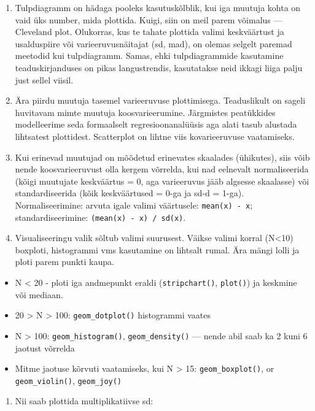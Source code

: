 \documentclass[]{book}
\providecommand{\tightlist}{%
  \setlength{\itemsep}{0pt}\setlength{\parskip}{0pt}}
\begin{document}
\begin{enumerate}
\item
  Tulpdiagramm on hädaga pooleks kasutuskõlblik, kui iga muutuja kohta on vaid üks number, mida plottida. Kuigi, siin on meil parem võimalus --- Cleveland plot. Olukorras, kus te tahate plottida valimi keskväärtust ja usalduspiire või varieeruvusnäitajat (sd, mad), on olemas selgelt paremad meetodid kui tulpdiagramm. Samas, ehki tulpdiagrammide kasutamine teaduskirjanduses on pikas langustrendis, kasutatakse neid ikkagi liiga palju just sellel viisil.
\item
  Ära piirdu muutuja tasemel varieeruvuse plottimisega. Teaduslikult on sageli huvitavam mimte muutuja koosvarieerumine. Järgmistes peatükkides modelleerime seda formaalselt regresioonanalüüsis aga alati tasub alustada lihtsatest plottidest. Scatterplot on lihtne viis kovarieeruvuse vaatamiseks.
\item
  Kui erinevad muutujad on mõõdetud erinevates skaalades (ühikutes), siis võib nende koosvarieeruvust olla kergem võrrelda, kui nad eelnevalt normaliseerida (kõigi muutujate keskväärtus = 0, aga varieeruvus jääb algsesse skaalasse) või standardiseerida (kõik keskväärtused = 0-ga ja sd-d = 1-ga).
  Normaliseerimine: arvuta igale valimi väärtusele: \texttt{mean(x)\ -\ x}; standardiseerimine: \texttt{(mean(x)\ -\ x)\ /\ sd(x)}.
\item
  Visualiseeringu valik sõltub valimi suurusest. Väikse valimi korral (N\textless{}10) boxploti, histogrammi vms kasutamine on lihtsalt rumal. Ära mängi lolli ja ploti parem punkti kaupa.
\end{enumerate}

\begin{itemize}
\item
  N \textless{} 20 - ploti iga andmepunkt eraldi (\texttt{stripchart()}, \texttt{plot()}) ja keskmine või mediaan.
\item
  20 \textgreater{} N \textgreater{} 100: \texttt{geom\_dotplot()} histogrammi vaates
\item
  N \textgreater{} 100: \texttt{geom\_histogram()}, \texttt{geom\_density()} --- nende abil saab ka 2 kuni 6 jaotust võrrelda
\item
  Mitme jaotuse kõrvuti vaatamiseks, kui N \textgreater{} 15: \texttt{geom\_boxplot()}, or \texttt{geom\_violin()}, \texttt{geom\_joy()}
\end{itemize}

\begin{enumerate}
\def\labelenumi{\arabic{enumi}.}
\setcounter{enumi}{10}
\tightlist
\item
  Nii saab plottida multiplikatiivse sd:
\end{enumerate}
\end{document}

